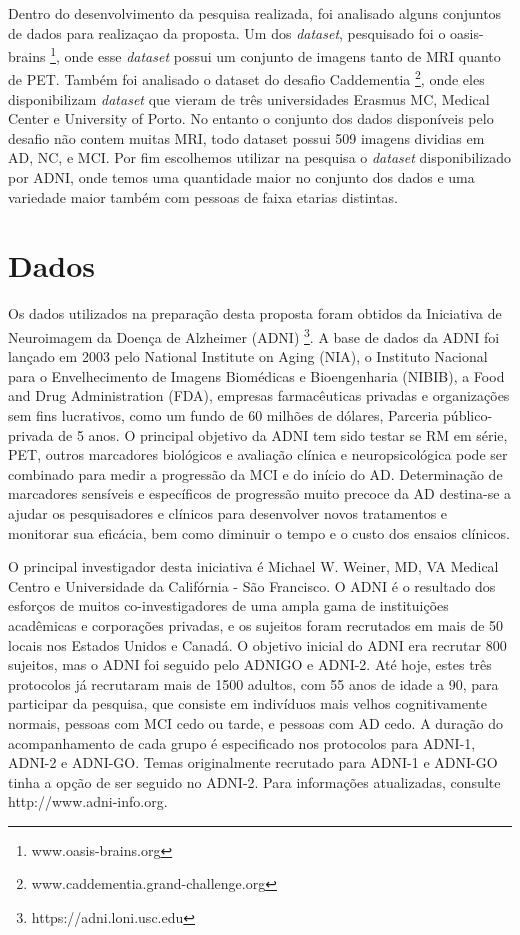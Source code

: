 \documentclass[openright]{UFRGS} %
\begin{document}
Dentro do desenvolvimento da pesquisa realizada, foi analisado alguns conjuntos de dados para realizaçao da proposta. Um dos \textit{dataset}, pesquisado foi o oasis-brains \footnote{www.oasis-brains.org}, onde esse \textit{dataset} possui um conjunto de imagens tanto de MRI quanto de PET. Também foi analisado o dataset do desafio Caddementia \footnote{www.caddementia.grand-challenge.org}, onde eles disponibilizam \textit{dataset} que vieram  de três universidades 	
Erasmus MC, Medical Center e University of Porto. No entanto o conjunto dos dados disponíveis pelo desafio não  contem muitas MRI, todo dataset possui 509 imagens dividias em AD, NC, e MCI. Por fim  escolhemos utilizar na pesquisa o \textit{dataset} disponibilizado por ADNI, onde temos uma quantidade maior no conjunto dos dados e uma variedade  maior também com pessoas de faixa etarias distintas.   



\section{Dados}

Os dados utilizados na preparação desta proposta foram obtidos da Iniciativa de Neuroimagem da Doença de Alzheimer (ADNI) \footnote{https://adni.loni.usc.edu}. A base de dados da ADNI
foi lançado em 2003 pelo National Institute on Aging (NIA), o Instituto Nacional para o Envelhecimento
de Imagens Biomédicas e Bioengenharia (NIBIB), a Food and Drug Administration
(FDA), empresas farmacêuticas privadas e organizações sem fins lucrativos, como um fundo de 60 milhões de dólares,
Parceria público-privada de 5 anos. O principal objetivo da ADNI tem sido testar se
RM em série, PET, outros marcadores biológicos e avaliação clínica e neuropsicológica
pode ser combinado para medir a progressão da MCI e do início do AD. Determinação de
marcadores sensíveis e específicos de progressão muito precoce da AD destina-se a ajudar os pesquisadores
e clínicos para desenvolver novos tratamentos e monitorar sua eficácia, bem como diminuir
o tempo e o custo dos ensaios clínicos.

O principal investigador desta iniciativa é Michael W. Weiner, MD, VA Medical
Centro e Universidade da Califórnia - São Francisco. O ADNI é o resultado dos esforços de muitos
co-investigadores de uma ampla gama de instituições acadêmicas e corporações privadas,
e os sujeitos foram recrutados em mais de 50 locais nos Estados Unidos e Canadá. O objetivo inicial do ADNI era recrutar 800 sujeitos, mas o ADNI foi seguido pelo ADNIGO e ADNI-2.
 Até hoje, estes três protocolos já recrutaram mais de 1500 adultos, com 55 anos de idade
a 90, para participar da pesquisa, que consiste em indivíduos mais velhos cognitivamente normais,
pessoas com MCI cedo ou tarde, e pessoas com AD cedo. A duração do acompanhamento de
cada grupo é especificado nos protocolos para ADNI-1, ADNI-2 e ADNI-GO. Temas
originalmente recrutado para ADNI-1 e ADNI-GO tinha a opção de ser seguido no ADNI-2.
Para informações atualizadas, consulte http://www.adni-info.org.
\end{document}
